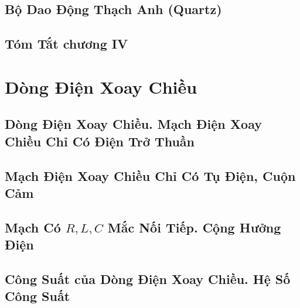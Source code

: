 \documentclass{article}
\numberwithin{equation}{section}
\begin{document}

\subsection{Bộ Dao Động Thạch Anh (Quartz)}


\subsection{Tóm Tắt chương IV}


\section{Dòng Điện Xoay Chiều}

\subsection{Dòng Điện Xoay Chiều. Mạch Điện Xoay Chiều Chỉ Có Điện Trở Thuần}


\subsection{Mạch Điện Xoay Chiều Chỉ Có Tụ Điện, Cuộn Cảm}


\subsection{Mạch Có $R,L,C$ Mắc Nối Tiếp. Cộng Hưởng Điện}


\subsection{Công Suất của Dòng Điện Xoay Chiều. Hệ Số Công Suất}

\end{document}
